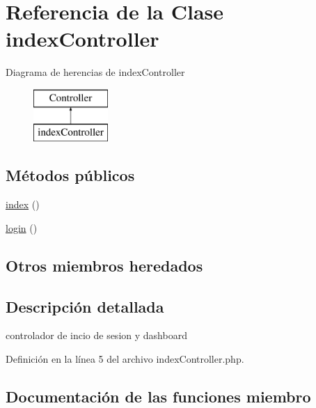 \hypertarget{classindex_controller}{}\section{Referencia de la Clase index\+Controller}
\label{classindex_controller}
Diagrama de herencias de index\+Controller\begin{figure}[H]
\begin{center}
\leavevmode
\includegraphics[height=2.000000cm]{classindex_controller}
\end{center}
\end{figure}
\subsection*{Métodos públicos}
\begin{DoxyCompactItemize}
\item 
\mbox{\hyperlink{classindex_controller_a6fcef784f4db52a9201f33ae902719e5}{index}} ()
\item 
\mbox{\hyperlink{classindex_controller_ad14fd2e2267073c8d3e13eb6ff7f7379}{login}} ()
\end{DoxyCompactItemize}
\subsection*{Otros miembros heredados}


\subsection{Descripción detallada}
controlador de incio de sesion y dashboard 

Definición en la línea 5 del archivo index\+Controller.\+php.



\subsection{Documentación de las funciones miembro}
\mbox{\label{classindex_controller_a6fcef784f4db52a9201f33ae902719e5}} 
